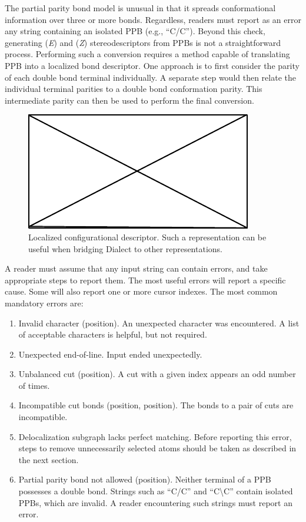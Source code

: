 \documentclass{article}
\begin{document}
The partial parity bond model is unusual in that it spreads conformational information over three or more bonds. Regardless, readers must report as an error any string containing an isolated PPB (e.g., \enquote{C/C}). Beyond this check, generating (\textit{E}) and (\textit{Z}) stereodescriptors from PPBs is not a straightforward process. Performing such a conversion requires a method capable of translating PPB into a localized bond descriptor. One approach is to first consider the parity of each double bond terminal individually. A separate step would then relate the individual terminal parities to a double bond conformation parity. This intermediate parity can then be used to perform the final conversion.

\begin{figure}
    \centering
    \includegraphics{filler}
    \caption{Localized configurational descriptor. Such a representation can be useful when bridging Dialect to other representations.}
    \label{fig:localized-configurational-descriptor}
\end{figure}

A reader must assume that any input string can contain errors, and take appropriate steps to report them. The most useful errors will report a specific cause. Some will also report one or more cursor indexes. The most common mandatory errors are:

\begin{enumerate}
    \item{Invalid character (position). An unexpected character was encountered. A list of acceptable characters is helpful, but not required.}
    \item{Unexpected end-of-line. Input ended unexpectedly.}
    \item{Unbalanced cut (position). A cut with a given index appears an odd number of times.}
    \item{Incompatible cut bonds (position, position). The bonds to a pair of cuts are incompatible.}
    \item{Delocalization subgraph lacks perfect matching. Before reporting this error, steps to remove unnecessarily selected atoms should be taken as described in the next section.}
    \item{Partial parity bond not allowed (position). Neither terminal of a PPB possesses a double bond. Strings such as \enquote{C/C} and \enquote{C{\textbackslash}C} contain isolated PPBs, which are invalid. A reader encountering such strings must report an error.}
\end{enumerate}
\end{document}
